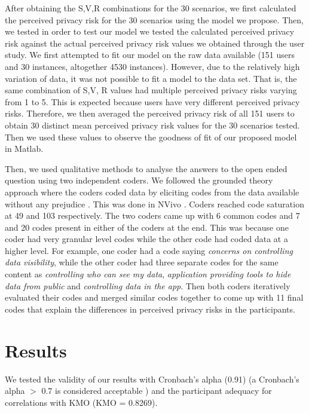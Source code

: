 \documentclass[10pt]{article}
\begin{document}
After obtaining the S,V,R combinations for the 30 scenarios, we first calculated the perceived privacy risk for the 30 scenarios using the model we propose. Then, we tested in order to test our model we tested the calculated perceived privacy risk against the actual perceived privacy risk values we obtained through the user study. We first attempted to fit our model on the raw data available (151 users and 30 instances, altogether 4530 instances). However, due to the relatively high variation of data, it was not possible to fit a model to the data set. That is, the same combination of S,V, R values had multiple perceived privacy risks varying from 1 to 5. This is expected because users have very different perceived privacy risks. Therefore, we then averaged the perceived privacy risk of all 151 users to obtain 30 distinct mean perceived privacy risk values for the 30 scenarios tested. Then we used these values to observe the goodness of fit of our proposed model in Matlab. 

Then, we used qualitative methods to analyse the answers to the open ended question using two independent coders. We followed the grounded theory approach where the coders coded data by eliciting codes from the data available without any prejudice \cite {wong2017eliciting}. This was done in NVivo \cite {saldana2015coding}. Coders reached code saturation at 49 and 103 respectively. The two coders came up with 6 common codes and 7 and 20 codes present in either of the coders at the end. This was because one coder had very granular level codes while the other code had coded data at a higher level. For example, one coder had a code saying \textit {concerns on controlling data visibility}, while the other coder had three separate codes for the same content as \textit {controlling who can see my data}, \textit {application providing tools to hide data from public} and \textit {controlling data in the app}. Then both coders iteratively evaluated their codes and merged similar codes together to come up with 11 final codes that explain the differences in perceived privacy risks in the participants.

\section {Results}

We tested the validity of our results with Cronbach's alpha (0.91) (a Cronbach's alpha $>$ 0.7 is considered acceptable \cite {nunnally1967psychometric}) and the participant adequacy for correlations with KMO (KMO =  0.8269). 
\end{document}
